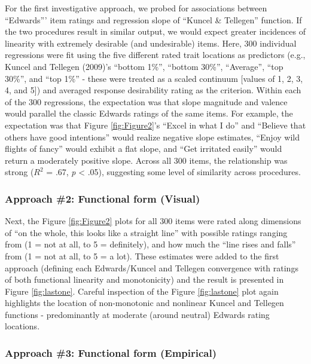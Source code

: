 \documentclass[
  ,jou]{apa6}
\begin{document}
For the first investigative approach, we probed for associations between ``Edwards''' item ratings and regression slope of ``Kuncel \& Tellegen'' function. If the two procedures result in similar output, we would expect greater incidences of linearity with extremely desirable (and undesirable) items. Here, 300 individual regressions were fit using the five different rated trait locations as predictors (e.g., Kuncel and Tellegen (2009)'s ``bottom 1\%'', ``bottom 30\%'', ``Average'', ``top 30\%'', and ``top 1\%'' - these were treated as a scaled continuum {[}values of 1, 2, 3, 4, and 5{]}) and averaged response desirability rating as the criterion. Within each of the 300 regressions, the expectation was that slope magnitude and valence would parallel the classic Edwards ratings of the same items. For example, the expectation was that Figure \ref{fig:Figure2}'s ``Excel in what I do'' and ``Believe that others have good intentions'' would realize negative slope estimates, ``Enjoy wild flights of fancy'' would exhibit a flat slope, and ``Get irritated easily'' would return a moderately positive slope. Across all 300 items, the relationship was strong (\(R^2\) = .67, \emph{p} \textless{} .05), suggesting some level of similarity across procedures.

\hypertarget{approach-2-functional-form-visual}{%
\subsubsection{Approach \#2: Functional form (Visual)}\label{approach-2-functional-form-visual}}

Next, the Figure \ref{fig:Figure2} plots for all 300 items were rated along dimensions of ``on the whole, this looks like a straight line'' with possible ratings ranging from (1 = not at all, to 5 = definitely), and how much the ``line rises and falls'' from (1 = not at all, to 5 = a lot). These estimates were added to the first approach (defining each Edwards/Kuncel and Tellegen convergence with ratings of both functional linearity and monotonicity) and the result is presented in Figure \ref{fig:lastone}. Careful inspection of the Figure \ref{fig:lastone} plot again highlights the location of non-monotonic and nonlinear Kuncel and Tellegen functions - predominantly at moderate (around neutral) Edwards rating locations.

\hypertarget{approach-3-functional-form-empirical}{%
\subsubsection{Approach \#3: Functional form (Empirical)}\label{approach-3-functional-form-empirical}}
\end{document}
